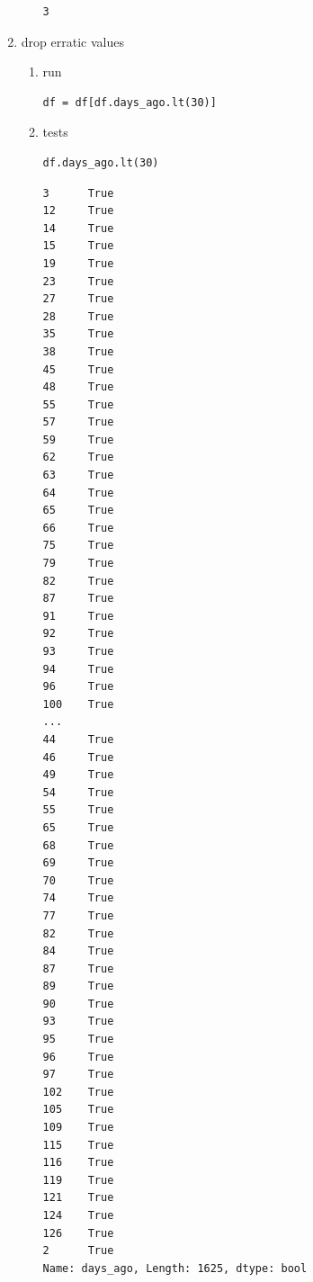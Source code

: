 \documentclass[11pt]{article}
\begin{document}
\begin{enumerate}
\begin{enumerate}
\begin{verbatim}
3
\end{verbatim}
\end{enumerate}
\item drop erratic values
\label{sec:org8fe073c}
\begin{enumerate}
\item run
\label{sec:org5df4b39}
\begin{verbatim}
df = df[df.days_ago.lt(30)]
\end{verbatim}
\item tests
\label{sec:org82cba8b}
\begin{verbatim}
df.days_ago.lt(30)
\end{verbatim}

\begin{verbatim}
3      True
12     True
14     True
15     True
19     True
23     True
27     True
28     True
35     True
38     True
45     True
48     True
55     True
57     True
59     True
62     True
63     True
64     True
65     True
66     True
75     True
79     True
82     True
87     True
91     True
92     True
93     True
94     True
96     True
100    True
...
44     True
46     True
49     True
54     True
55     True
65     True
68     True
69     True
70     True
74     True
77     True
82     True
84     True
87     True
89     True
90     True
93     True
95     True
96     True
97     True
102    True
105    True
109    True
115    True
116    True
119    True
121    True
124    True
126    True
2      True
Name: days_ago, Length: 1625, dtype: bool
\end{verbatim}
\end{enumerate}
\end{enumerate}
\end{document}
